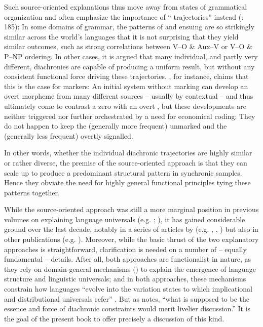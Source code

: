 \documentclass[output=paper]{langsci/langscibook}
\begin{document}
Such source-oriented explanations thus move away from  states of grammatical organization and often emphasize the importance of “ trajectories” instead (\citealt{BybeeBeckner2015}: 185): In some domains of grammar, the patterns of  and ensuing  are so strikingly similar across the world’s languages that it is not surprising that they yield similar outcomes, such as strong correlations between V–O \& Aux–V or V–O \& P–NP ordering. In other cases, it is argued that many individual, and partly very different, diachronies are capable of producing a uniform result, but without any consistent functional force driving these trajectories. \citet{Cristofaro2017}, for instance, claims that this is the case for  markers: An initial system without  marking can develop an overt  morpheme from many different sources – usually by contextual  – and thus ultimately come to contrast a zero  with an overt , but these developments are neither triggered nor further orchestrated by a need for economical coding: They do not happen to keep the (generally more frequent)  unmarked and the (generally less frequent)  overtly signalled. 

In other words, whether the individual diachronic trajectories are highly similar or rather diverse, the premise of the source-oriented approach is that they can scale up to produce a predominant structural pattern in synchronic samples. Hence they obviate the need for highly general functional principles tying these patterns together.

While the source-oriented approach was still a more marginal position in previous volumes on explaining language universals (e.g. \citealt{Hawkins1988_ExplEd}; \citealt{Good2008_Change}), it has gained considerable ground over the last decade, notably in a series of articles by  (e.g. \citealt{Cristofaro2012}, \citealt{Cristofaro2014}, \citealt{Cristofaro2017}) but also in other publications (e.g. \citealt{Anderson2016,Creissels2008,GildeaZúñiga2016}). Moreover, while the basic thrust of the two explanatory approaches is straightforward, clarification is needed on a number of – equally fundamental – details. After all, both approaches are functionalist in nature, as they rely on domain-general mechanisms (\citealt{Bybee2010}) to explain the emergence of language structure and linguistic universals; and in both approaches, these mechanisms constrain how languages “evolve into the variation states to which implicational and distributional universals refer” \citep[18]{Hawkins1988_Intro}. But as \citet[51]{Plank2007} notes, “what is supposed to be the essence and force of diachronic constraints would merit livelier discussion.” It is the goal of the present book to offer precisely a discussion of this kind.
\end{document}
